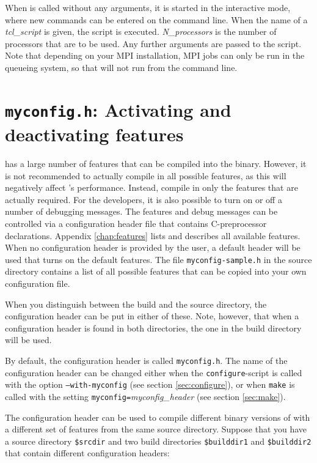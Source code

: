  When \es{} is called without any arguments,
it is started in the interactive mode, where new commands can be
entered on the command line. When the name of a \textit{tcl\_script}
is given, the script is executed. \textit{N\_processors} is the number
of processors that are to be used. Any further arguments are passed to
the script. Note that depending on your MPI installation, MPI jobs can
only be run in the queueing system, so that \es will not run from
the command line.


\section{\texttt{myconfig.h}: Activating and deactivating features}
\label{sec:myconfig}

   \es
has a large number of features that can be compiled into the binary.
However, it is not recommended to actually compile in all possible
features, as this will negatively affect \es's performance.  Instead,
compile in only the features that are actually required.  For the
developers, it is also possible to turn on or off a number of
debugging messages.  The features and debug messages can be controlled
via a configuration header file that contains C-preprocessor
declarations. Appendix \vref{chap:features} lists and describes all
available features.  When no configuration header is provided by the
user, a default header will be used that turns on the default
features.  The file \texttt{myconfig-sample.h} in the source directory
contains a list of all possible features that can be copied into your
own configuration file.

When you distinguish between the build and the source directory, the
configuration header can be put in either of these. Note, however,
that when a configuration header is found in both directories, the one
in the build directory will be used.

By default, the configuration header is called \texttt{myconfig.h}.
The name of the configuration header can be changed either when the
\texttt{configure}-script is called with the option
\mbox{\texttt{--with-myconfig}} (see section \vref{sec:configure}), or
when \texttt{make} is called with the setting
\mbox{\texttt{myconfig=}\textit{myconfig\_header}} (see section
\vref{sec:make}).

The configuration header can be used to compile different binary
versions of \es with a different set of features from the same source
directory.  Suppose that you have a source directory \texttt{\$srcdir}
and two build directories \texttt{\$builddir1} and
\texttt{\$builddir2} that contain different configuration headers:

